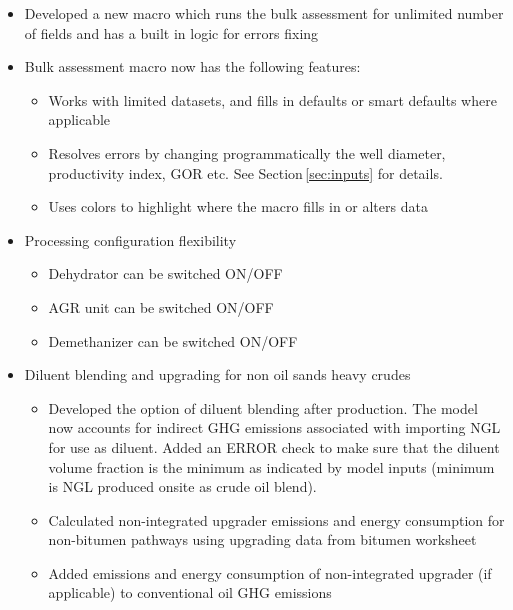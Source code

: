 \documentclass[11pt]{report}
\begin{document}
{{{{\begin{itemize}
\item{Developed a new macro which runs the bulk assessment for unlimited number of fields and has a built in logic for errors fixing}
\item{Bulk assessment macro now has the following features:}
\begin{itemize}
\item{Works with limited datasets, and fills in defaults or smart defaults where applicable}
\item{Resolves errors by changing programmatically the well diameter, productivity index, GOR etc. See Section\,\ref{sec:inputs} for details.}
\item{Uses colors to highlight where the macro fills in or alters data}
\end{itemize}
\item{Processing configuration flexibility}
\begin{itemize}
\item{Dehydrator can be switched ON/OFF}
\item{AGR unit can be switched ON/OFF}
\item{Demethanizer can be switched ON/OFF}
\end{itemize}
\item{Diluent blending and upgrading for non oil sands heavy crudes}
\begin{itemize}
\item{Developed the option of diluent blending after production. The model now accounts for indirect GHG emissions associated with importing NGL for use as diluent. Added an ERROR check to make sure that the diluent volume fraction is the minimum as indicated by model inputs (minimum is NGL produced onsite as crude oil blend).}
\item{Calculated non-integrated upgrader emissions and energy consumption for non-bitumen pathways using upgrading data from bitumen worksheet }
\item{Added emissions and energy consumption of non-integrated upgrader (if applicable) to conventional oil GHG emissions}
\end{itemize}
\end{itemize}

}}}}
\end{document}
